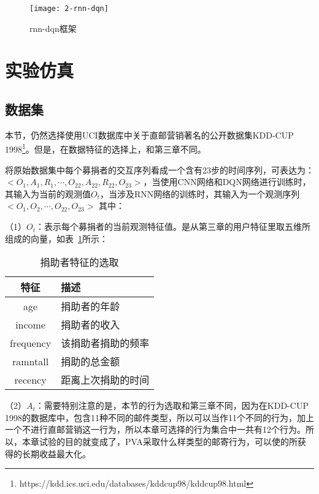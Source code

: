 \begin{figure}[htbp]
\centering
\texttt{[image: 2-rnn-dqn]}
\caption{rnn-dqn框架}
\label{fig:2-rnn-dqn}
\end{figure}

\section{实验仿真}


\subsection{数据集}
本节，仍然选择使用UCI数据库中关于直邮营销著名的公开数据集KDD-CUP 1998\footnote{https://kdd.ics.uci.edu/databases/kddcup98/kddcup98.html}。但是，在数据特征的选择上，和第三章不同。

将原始数据集中每个募捐者的交互序列看成一个含有23步的时间序列，可表达为：$<O_{1},A_{1},R_{1},\cdots,O_{22},A_{22},R_{22},O_{23}>$，当使用CNN网络和DQN网络进行训练时，其输入为当前的观测值$O_{t}$，当涉及RNN网络的训练时，其输入为一个观测序列$<O_{1},O_{2},\cdots,O_{22},O_{23}>$
其中：

（1）$O_{t}$：表示每个募捐者的当前观测特征值。是从第三章的用户特征里取五维所组成的向量，如表~\ref{tab:obser_donors4}所示：
\begin{table}[htbp]
  \centering
  \caption{捐助者特征的选取}
  \label{tab:obser_donors4}
  \begin{tabular}{cl}
    \toprule
      特征 & 描述 \\
    \midrule
      age & 捐助者的年龄 \\
      income & 捐助者的收入 \\
      frequency & 该捐助者捐助的频率\\
      ramntall & 捐助的总金额 \\
      recency & 距离上次捐助的时间 \\
    \bottomrule
  \end{tabular}
\end{table}

（2）$A_{t}$：需要特别注意的是，本节的行为选取和第三章不同，因为在KDD-CUP 1998的数据库中，包含11种不同的邮件类型，所以可以当作11个不同的行为，加上一个不进行直邮营销这一行为，所以本章可选择的行为集合中一共有12个行为。所以，本章试验的目的就变成了，PVA采取什么样类型的邮寄行为，可以使的所获得的长期收益最大化。

